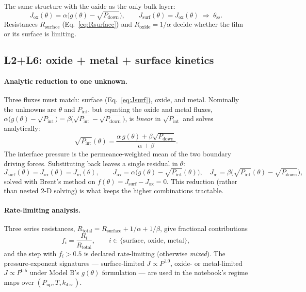 \documentclass[11pt,a4paper]{article}
\newcommand{\Pup}{P_{\mathrm{up}}}
\newcommand{\Pdown}{P_{\mathrm{down}}}
\newcommand{\Pint}{P_{\mathrm{int}}}
\newcommand{\kdiss}{k_{\mathrm{diss}}}
\newcommand{\Rsurf}{R_{\mathrm{surface}}}
\newcommand{\Rox}{R_{\mathrm{oxide}}}
\begin{document}
The same structure with the oxide as the only bulk layer:
\begin{equation}
  J_{\mathrm{ox}}(\theta) = \alpha\bigl(g(\theta) - \sqrt{\Pdown}\bigr),
  \qquad
  J_{\mathrm{surf}}(\theta) = J_{\mathrm{ox}}(\theta)
  \;\Longrightarrow\; \theta_{\mathrm{ss}}.
  \label{eq:JoxL2aL6}
\end{equation}
Resistances $\Rsurf$ (Eq.~\eqref{eq:Rsurface}) and $\Rox = 1/\alpha$ decide
whether the film or its surface is limiting.

\subsection{L2+L6: oxide + metal + surface kinetics}

\paragraph{Analytic reduction to one unknown.} Three fluxes must match:
surface (Eq.~\eqref{eq:Jsurf}), oxide, and metal. Nominally the unknowns are
$\theta$ and $\Pint$, but equating the oxide and metal fluxes,
$\alpha\bigl(g(\theta) - \sqrt{\Pint}\bigr) =
\beta\bigl(\sqrt{\Pint} - \sqrt{\Pdown}\bigr)$, is \emph{linear} in
$\sqrt{\Pint}$ and solves analytically:
\begin{equation}
  \sqrt{\Pint}(\theta)
  = \frac{\alpha\, g(\theta) + \beta \sqrt{\Pdown}}{\alpha + \beta}.
  \label{eq:PintTheta}
\end{equation}
The interface pressure is the permeance-weighted mean of the two boundary
driving forces. Substituting back leaves a single residual in $\theta$:
\begin{equation}
  J_{\mathrm{surf}}(\theta)
  = J_{\mathrm{ox}}(\theta)
  = J_{\mathrm{m}}(\theta), \qquad
  J_{\mathrm{ox}} = \alpha\bigl(g(\theta) - \sqrt{\Pint}(\theta)\bigr), \quad
  J_{\mathrm{m}} = \beta\bigl(\sqrt{\Pint}(\theta) - \sqrt{\Pdown}\bigr),
  \label{eq:tripleflux}
\end{equation}
solved with Brent's method on $f(\theta) = J_{\mathrm{surf}} -
J_{\mathrm{ox}} = 0$. This reduction (rather than nested 2-D solving) is what
keeps the higher combinations tractable.

\paragraph{Rate-limiting analysis.} Three series resistances,
$R_{\mathrm{total}} = \Rsurf + 1/\alpha + 1/\beta$, give fractional
contributions
\begin{equation}
  f_i = \frac{R_i}{R_{\mathrm{total}}}, \qquad
  i \in \{\text{surface},\, \text{oxide},\, \text{metal}\},
  \label{eq:fractions}
\end{equation}
and the step with $f_i > 0.5$ is declared rate-limiting (otherwise
\emph{mixed}). The pressure-exponent signatures --- surface-limited
$J \propto P^{1.0}$, oxide- or metal-limited $J \propto P^{0.5}$ under
Model B's $g(\theta)$ formulation --- are used in the notebook's regime maps
over $(\Pup, T, \kdiss)$.
\end{document}

